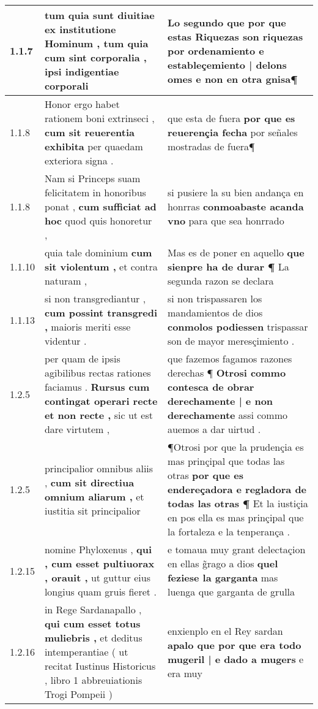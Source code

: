 \begin{tabular}{|p{1cm}|p{6.5cm}|p{6.5cm}|}

\hline
1.1.7 & tum quia sunt diuitiae \textbf{ ex institutione Hominum , tum quia cum sint corporalia , } ipsi indigentiae corporali & Lo segundo que por que estas Riquezas son riquezas \textbf{ por ordenamiento e estableçemiento | delons omes } e non en otra gnisa¶ \\\hline
1.1.8 & Honor ergo habet rationem boni extrinseci , \textbf{ cum sit reuerentia exhibita } per quaedam exteriora signa . & que esta de fuera \textbf{ por que es reuerençia fecha } por señales mostradas de fuera¶ \\\hline
1.1.8 & Nam si Princeps suam felicitatem in honoribus ponat , \textbf{ cum sufficiat ad hoc } quod quis honoretur , & si pusiere la su bien andança en honrras \textbf{ conmoabaste acanda vno } para que sea honrrado \\\hline
1.1.10 & quia tale dominium \textbf{ cum sit violentum , } et contra naturam , & Mas es de poner en aquello \textbf{ que sienpre ha de durar ¶ } La segunda razon se declara \\\hline
1.1.13 & si non transgrediantur , \textbf{ cum possint transgredi , } maioris meriti esse videntur . & si non trispassaren los mandamientos de dios \textbf{ conmolos podiessen } trispassar son de mayor meresçimiento . \\\hline
1.2.5 & per quam de ipsis agibilibus rectas rationes faciamus . \textbf{ Rursus cum contingat operari recte et non recte , } sic ut est dare virtutem , & que fazemos fagamos razones derechas ¶ \textbf{ Otrosi commo contesca de obrar derechamente | e non derechamente } assi commo auemos a dar uirtud . \\\hline
1.2.5 & principalior omnibus aliis , \textbf{ cum sit directiua omnium aliarum , } et iustitia sit principalior & ¶Otrosi por que la prudençia es mas prinçipal que todas las otras \textbf{ por que es endereçadora e regladora de todas las otras ¶ } Et la iustiçia en pos ella es mas prinçipal que la fortaleza e la tenperança . \\\hline
1.2.15 & nomine Phyloxenus , \textbf{ qui , cum esset pultiuorax , orauit , } ut guttur eius longius quam gruis fieret . & e tomaua muy grant delectaçion en ellas g̃rago a dios \textbf{ quel feziese la garganta } mas luenga que garganta de grulla \\\hline
1.2.16 & in Rege Sardanapallo , \textbf{ qui cum esset totus muliebris , } et deditus intemperantiae ( ut recitat Iustinus Historicus , libro 1 abbreuiationis Trogi Pompeii ) & enxienplo en el Rey sardan \textbf{ apalo que por que era todo mugeril | e dado a mugers } e era muy \\\hline

\end{tabular}
